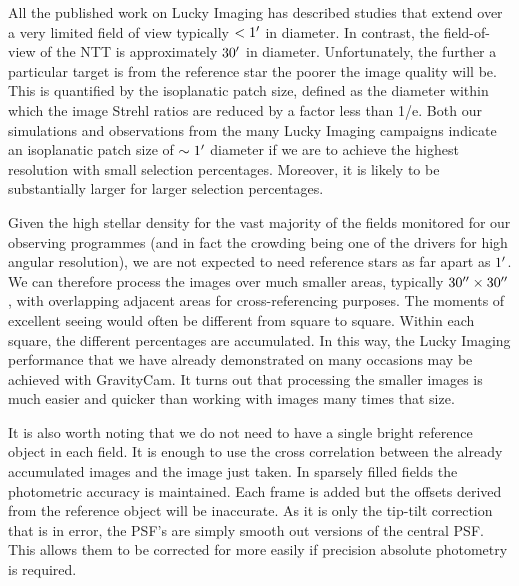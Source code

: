 \documentclass{pasa}%
\newcommand\arcmin{\hbox{$^\prime$}}
\newcommand\arcsec{\hbox{$^{\prime\prime}$}}
\begin{document}
All the published work on Lucky Imaging has described studies that extend over a very limited field of view typically $< 1\arcmin$ in diameter. In contrast, the field-of-view of the NTT is approximately $30\arcmin$ in
diameter.
Unfortunately, the further a particular target is from the reference star the poorer the image quality will be. This is quantified by the isoplanatic patch size, defined as the diameter within which the image Strehl ratios are reduced by a factor less than 1/e. Both our simulations and observations from the many Lucky Imaging campaigns indicate an isoplanatic patch size of $\sim 1\arcmin$ diameter if we are to achieve  the highest resolution with small selection percentages. Moreover, it is likely to be substantially larger for larger selection percentages.

Given the high stellar density for the vast majority of the fields monitored for our observing programmes (and in fact the crowding being one of the drivers for high angular resolution),
we are not expected to need reference stars as far apart as $1\arcmin$. 
We can therefore process the images over much smaller areas, typically $30\arcsec \times 30\arcsec$, with overlapping adjacent areas for cross-referencing purposes.
The moments of excellent seeing would often be different from square to square. Within each square, the different percentages are accumulated. In this way, the Lucky Imaging performance that we have already demonstrated on many occasions may be achieved with GravityCam. It turns out that processing the smaller images is much easier and quicker than working with images many times that size.

It is also worth noting that we do not need to have a single bright reference object in each field. It is enough to use the cross correlation between the already accumulated images and the image just taken.
In sparsely filled fields the photometric accuracy is maintained. Each frame is added but the offsets derived from the
reference object will be inaccurate. As it is only the tip-tilt correction that is in error, the PSF's are simply smooth out versions of the central PSF. This allows them to be corrected for more easily if
precision absolute photometry is required. 
\end{document}
